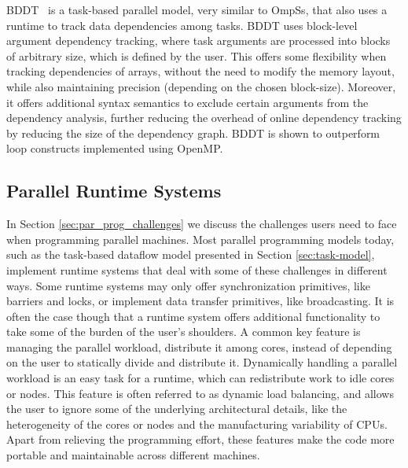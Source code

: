 BDDT~\cite{Tzenakis:2012:BBD:2370036.2145864} is a task-based parallel model, very similar
to OmpSs, that also uses a runtime to track data dependencies among tasks.  BDDT uses
block-level argument dependency tracking, where task arguments are processed into blocks
of arbitrary size, which is defined by the user.  This offers some flexibility when
tracking dependencies of arrays, without the need to modify the memory layout, while also
maintaining precision (depending on the chosen block-size).  Moreover, it offers
additional syntax semantics to exclude certain arguments from the dependency analysis,
further reducing the overhead of online dependency tracking by reducing the size of the
dependency graph.  BDDT is shown to outperform loop constructs implemented using OpenMP. 

\subsection{Parallel Runtime Systems}  
In Section \ref{sec:par_prog_challenges} we discuss the challenges users need
to face when programming parallel machines.  Most parallel programming models
today, such as the task-based dataflow model presented in Section
\ref{sec:task-model}, implement runtime systems that deal with some of these
challenges in different ways.  Some runtime systems may only offer
synchronization primitives, like barriers and locks, or implement data transfer
primitives, like broadcasting.  It is often the case though that a runtime
system offers additional functionality to take some of the burden of the user's
shoulders.  A common key feature is managing the parallel workload, distribute
it among cores, instead of depending on the user to statically divide and
distribute it.  Dynamically handling a parallel workload is an easy task for a
runtime, which can redistribute work to idle cores or nodes.  This feature is
often referred to as dynamic load balancing, and allows the user to ignore some
of the underlying architectural details, like the heterogeneity of the cores or
nodes and the manufacturing variability of CPUs.  Apart from relieving the
programming effort, these features make the code more portable and maintainable
across different machines. 

